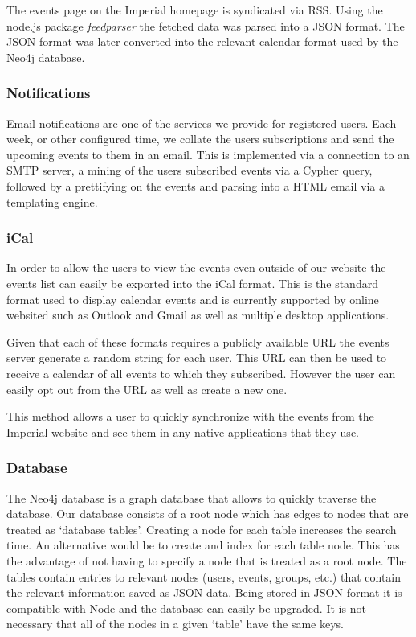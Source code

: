 \documentclass[11pt]{article}
\begin{document}
The events page on the Imperial homepage is syndicated via RSS. Using the node.js package \textit{feedparser} the fetched data was parsed into a JSON format. The JSON format was later converted into the relevant calendar format used by the Neo4j database.

\subsubsection{Notifications}
Email notifications are one of the services we provide for registered users. Each week, or other configured time, we collate the users subscriptions and send the upcoming events to them in an email. This is implemented via a connection to an SMTP server, a mining of the users subscribed events via a Cypher query, followed by a prettifying on the events and parsing into a HTML email via a templating engine.

\subsubsection{iCal}

In order to allow the users to view the events even outside of our website the events list can easily be exported into the iCal format. This is the standard format used to display calendar events and is currently supported by online websited such as Outlook and Gmail as well as multiple desktop applications.

Given that each of these formats requires a publicly available URL the events server generate a random string for each user. This URL can then be used to receive a calendar of all events to which they subscribed. However the user can easily opt out from the URL as well as create a new one.

This method allows a user to quickly synchronize with the events from the Imperial website and see them in any native applications that they use.

\subsubsection{Database}

The Neo4j database is a graph database that allows to quickly traverse the database.
Our database consists of a root node which has edges to nodes that are treated as `database tables'.
Creating a node for each table increases the search time. An alternative would be to create and index for each table node. This has the advantage of not having to specify a node that is treated as a root node.
The tables contain entries to relevant nodes (users, events, groups, etc.) that contain the relevant information saved as JSON data. Being stored in JSON format it is compatible with Node and the database can easily be upgraded. It is not necessary that all of the nodes in a given `table' have the same keys.
\end{document}
